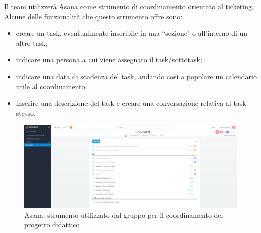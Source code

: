 
            Il team utilizzerà Asana come strumento di coordinamento orientato al ticketing.
            Alcune delle funzionalità che questo strumento offre sono:

                \begin{itemize}
                    \item creare un task, eventualmente inseribile in una ``sezione" o all'interno di un altro task;
                    \item indicare una persona a cui viene assegnato il task/sottotask;
                    \item indicare una data di scadenza del task, andando così a popolare un calendario utile al coordinamento;
                    \item inserire una descrizione del task e creare una conversazione relativa al task stesso.
                \end{itemize}


                \begin{figure}[htbp]
                    \centering
                    \includegraphics[scale=0.25]{./img/asana.png}
                    \caption[Asana]{Asana: strumento utilizzato dal gruppo per il coordinamento del progetto didattico}
                \end{figure}


